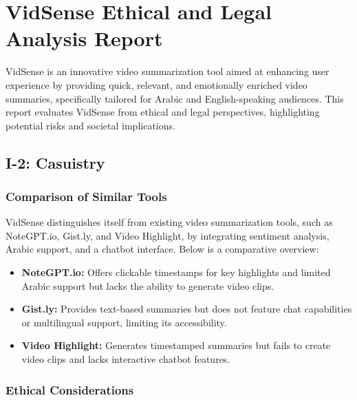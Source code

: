 \documentclass{bscs}
\begin{document}
\chapter{VidSense Ethical and Legal Analysis Report}

VidSense is an innovative video summarization tool aimed at enhancing user experience by
providing quick, relevant, and emotionally enriched video summaries, specifically tailored for
Arabic and English-speaking audiences. This report evaluates VidSense from ethical and legal
perspectives, highlighting potential risks and societal implications. 

\section{I-2: Casuistry}

\subsection{Comparison of Similar Tools}

VidSense distinguishes itself from existing video summarization tools, such as NoteGPT.io,
Gist.ly, and Video Highlight, by integrating sentiment analysis, Arabic support, and a chatbot
interface. Below is a comparative overview: 

\begin{itemize}
    \item \textbf{NoteGPT.io:} Offers clickable timestamps for key highlights and limited Arabic support but lacks the ability to generate video clips. 
    
    \item \textbf{Gist.ly:} Provides text-based summaries but does not feature chat capabilities or
multilingual support, limiting its accessibility.

    \item \textbf{Video Highlight:} Generates timestamped summaries but fails to create video clips and lacks interactive chatbot features.
\end{itemize}

\subsection{Ethical Considerations}
\end{document}
